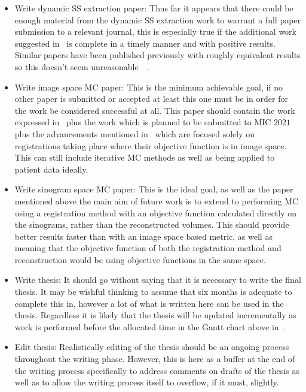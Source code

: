 \begin{itemize}
                \item Write dynamic \gls{SS} extraction paper: Thus far it appears that there could be enough material from the dynamic \gls{SS} extraction work to warrant a full paper submission to a relevant journal, this is especially true if the additional work suggested in~ is complete in a timely manner and with positive results. Similar papers have been published previously with roughly equivalent results so this doesn't seem unreasonable~~.
                
                \item Write image space \gls{MC} paper: This is the minimum achievable goal, if no other paper is submitted or accepted at least this one must be in order for the work be considered successful at all. This paper should contain the work expressed in~ plus the work which is planned to be submitted to \gls{MIC} $2021$ plus the advancements mentioned in~ which are focused solely on registrations taking place where their objective function is in image space. This can still include iterative \gls{MC} methods as well as being applied to patient data ideally.
                
                \item Write sinogram space \gls{MC} paper: This is the ideal goal, as well as the paper mentioned above the main aim of future work is to extend to performing \gls{MC} using a registration method with an objective function calculated directly on the sinograms, rather than the reconstructed volumes. This should provide better results faster than with an image space based metric, as well as meaning that the objective function of both the registration method and reconstruction would be using objective functions in the same space.
                
                \item Write thesis: It should go without saying that it is necessary to write the final thesis. It may be wishful thinking to assume that six months is adequate to complete this in, however a lot of what is written here can be used in the thesis. Regardless it is likely that the thesis will be updated incrementally as work is performed before the allocated time in the Gantt chart above in~.
    
                \item Edit thesis: Realistically editing of the thesis should be an ongoing process throughout the writing phase. However, this is here as a buffer at the end of the writing process specifically to address comments on drafts of the thesis as well as to allow the writing process itself to overflow, if it must, slightly.
            \end{itemize}
        
